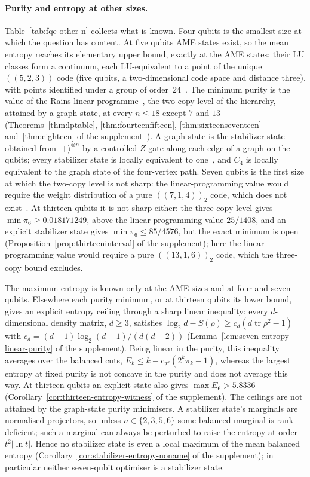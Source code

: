 \documentclass[11pt]{article}
\begin{document}
\paragraph{Purity and entropy at other sizes.} Table~\ref{tab:fqe-other-n} collects what is known. Four qubits is the
smallest size at which the question has content. At five qubits AME states exist, so the mean entropy reaches its
elementary upper bound, exactly at the AME states; their LU classes form a continuum, each LU-equivalent to a point of the
unique $((5,2,3))$ code (five qubits, a two-dimensional code space and distance three), with points identified under a
group of order~24~\cite{Tan}. The minimum purity is
the value of the Rains linear programme~\cite{Rains,HESG}, the two-copy level of the hierarchy, attained by a graph state, at
every $n\le18$ except $7$ and $13$ (Theorems~\ref{thm:lptable}, \ref{thm:fourteenfifteen}, \ref{thm:sixteenseventeen}
and~\ref{thm:eighteen} of the supplement~\cite{Companion}). A graph state is the stabilizer state obtained from
$|+\rangle^{\otimes n}$ by a controlled-$Z$ gate along each edge of a graph on the qubits; every stabilizer state is
locally equivalent to one~\cite{VdN,HEB}, and $C_4$ is locally equivalent to the graph state of the four-vertex path. Seven qubits is the first size at which the two-copy level is
not sharp: the linear-programming value would require the weight distribution of a pure $((7,1,4))_2$ code, which does
not exist~\cite{HGS}. At thirteen qubits it is not sharp either: the three-copy level gives $\min\pi_6\ge0.018171249$, above the
linear-programming value $25/1408$, and an explicit stabilizer state gives $\min\pi_6\le85/4576$, but the exact minimum
is open (Proposition~\ref{prop:thirteeninterval} of the supplement); here the linear-programming value would require a
pure $((13,1,6))_2$ code, which the three-copy bound excludes.

The maximum entropy is known only at the AME sizes
and at four and seven qubits. Elsewhere each purity minimum, or at thirteen qubits its lower bound, gives an explicit
entropy ceiling through a sharp linear inequality: every $d$-dimensional density matrix, $d\ge3$, satisfies
$\log_2d-S(\rho)\ge c_d(d\operatorname{tr}\rho^2-1)$ with $c_d=(d-1)\log_2(d-1)/(d(d-2))$
(Lemma~\ref{lem:seven-entropy-linear-purity} of the supplement). Being linear in the purity, this inequality averages over the
balanced cuts, $E_k\le k-c_{2^k}(2^k\pi_k-1)$, whereas the largest entropy at fixed purity is not concave in the purity and
does not average this way. At thirteen qubits an explicit state also gives $\max E_6>5.8336$
(Corollary~\ref{cor:thirteen-entropy-witness} of the supplement). The ceilings are not attained by the graph-state
purity minimisers. A stabilizer state's marginals are normalised projectors, so unless $n\in\{2,3,5,6\}$ some balanced
marginal is rank-deficient; such a marginal can always be perturbed to raise the entropy at order $t^2|\ln t|$.
Hence no stabilizer state is even a local maximum of the mean balanced entropy
(Corollary~\ref{cor:stabilizer-entropy-noname} of the supplement); in particular neither seven-qubit optimiser is a
stabilizer state.
\end{document}
